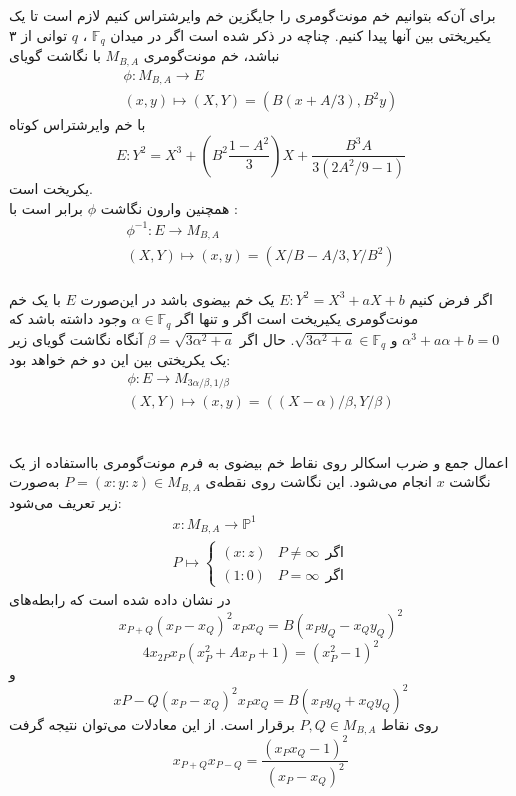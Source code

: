 برای آن‌که بتوانیم خم مونت‌گومری را جایگزین خم وایرشتراس کنیم لازم است تا یک یکیریختی بین آنها پیدا کنیم. چناچه در 
\cite{montgomery_arithmetic}
ذکر شده است اگر در میدان 
$\mathbb{F}_q$
،
$q$
توانی از ۳ نباشد، خم مونت‌گومری 
$M_{B,A}$
با نگاشت گویای
\[
\begin{gathered}
 \phi : M_{B,A} \longrightarrow E \\
(x,y) \mapsto (X,Y) = (B(x+A/3), B^2y)
\end{gathered}
\]
با خم وایرشتراس کوتاه
$$ E : Y^2 = X^3 + (B^2 \frac{1-A^2}{3})X + \frac{B^3A}{3(2A^2/9-1)} $$
یکریخت است.
\\
 همچنین وارون نگاشت 
$\phi$
برابر است با :
\[
\begin{gathered}
{\phi}^{-1} : E \longrightarrow M_{B,A} \\
(X,Y) \mapsto (x,y) = (X/B - A/3, Y/B^2)
\end{gathered}
\]
\\
اگر فرض ‌کنیم
$ E : Y^2 = X^3+aX+b $
یک خم بیضوی باشد در این‌صورت 
$E$
با یک خم مونت‌گومری یکیریخت است اگر و تنها اگر 
$\alpha \in \mathbb{F}_q$
وجود داشته باشد که 
${\alpha}^3+a\alpha+b=0$
و
$\sqrt{3{\alpha}^2 +a} \in \mathbb{F}_q$.
حال اگر 
$\beta = \sqrt{3{\alpha}^2 +a}$
آنگاه نگاشت گویای زیر یک یکریختی بین این دو خم خواهد بود:
\[
\begin{gathered}
{\phi} : E \longrightarrow M_{{3\alpha/\beta},{1/\beta}} \\
(X,Y) \mapsto (x,y) = ((X-\alpha)/\beta, Y/\beta)
\end{gathered}
\]
\\
\\
اعمال جمع و ضرب اسکالر روی نقاط خم بیضوی به فرم مونت‌‌گومری  بااستفاده از یک نگاشت
$x$
انجام می‌شود. این نگاشت روی نقطه‌ی 
$ P = (x:y:z) \in M_{B,A} $
به‌صورت زیر تعریف می‌شود:
\[
\begin{gathered}
x : M_{B,A} \longrightarrow \mathbb{P}^1 \\
P \mapsto 
\begin{cases}
(x:z) & P \ne \infty ~~\text{اگر} \\
(1:0) & P = \infty ~~\text{اگر}
\end{cases}
\end{gathered}
\]
در
\cite{montgomery_speeding}
نشان داده شده است که رابطه‌های
$$ x_{P+Q}(x_P-x_Q)^2x_Px_Q = B(x_Py_Q - x_Qy_Q)^2 $$
$$ 4x_{2P}x_P(x_P^2+Ax_P+1) = (x_P^2 - 1)^2 $$
و
$$ x{P-Q}(x_P-x_Q)^2x_Px_Q = B(x_Py_Q + x_Qy_Q)^2 $$
روی نقاط
$ P,Q \in M_{B,A} $
برقرار است. از این معادلات می‌توان نتیجه گرفت
$$ x_{P+Q}x_{P-Q} = \frac{(x_Px_Q - 1)^2}{(x_P-x_Q)^2} $$
